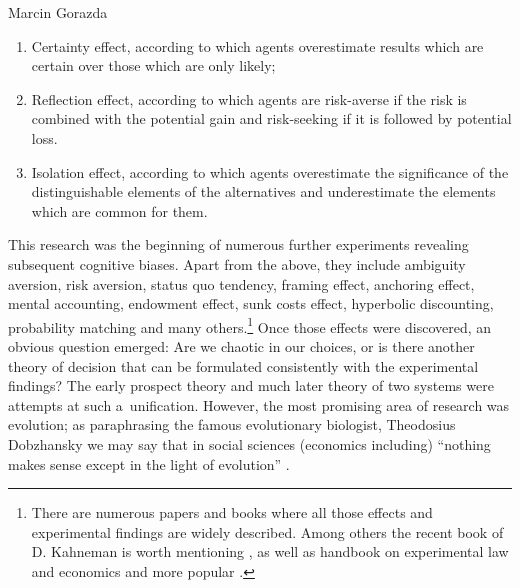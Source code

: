 \begin{artengenv}{Marcin Gorazda}
\begin{enumerate}
\item Certainty effect, according to which agents overestimate results which are certain over those which are only likely;
\item Reflection effect, according to which agents are risk-averse if the risk is combined with the potential gain and risk-seeking if it is followed by potential loss.
\item Isolation effect, according to which agents overestimate the significance of the distinguishable elements of the alternatives and underestimate the elements which are common for them.
\end{enumerate}
This research was the beginning of numerous further experiments revealing subsequent cognitive biases. Apart from the above, they include ambiguity aversion, risk aversion, status quo tendency, framing effect, anchoring effect, mental accounting, endowment effect, sunk costs effect, hyperbolic discounting, probability matching and many others.\footnote{There are numerous papers and books where all those effects and experimental findings are widely described. Among others the recent book of D. Kahneman is worth mentioning
\parencite*[][]{kahneman_thinking_2011}, %
 as well as handbook on experimental law and economics 
\parencite[][]{arlen_experimental_2008} %
 and more popular 
\parencites[][]{petersdorff_denkfehler_2013}[][]{shermer_mind_2008}.%
} Once those effects were discovered, an obvious question emerged: Are we chaotic in our choices, or is there another theory of decision that can be formulated consistently with the experimental findings? The early prospect theory and much later theory of two systems were attempts at such a~unification. However, the most promising area of research was evolution; as paraphrasing the famous evolutionary biologist, Theodosius Dobzhansky we may say that in social sciences (economics including) ``nothing makes sense except in the light of evolution'' 
\parencite[][]{dobzhansky_nothing_1973}.%



\end{artengenv}
